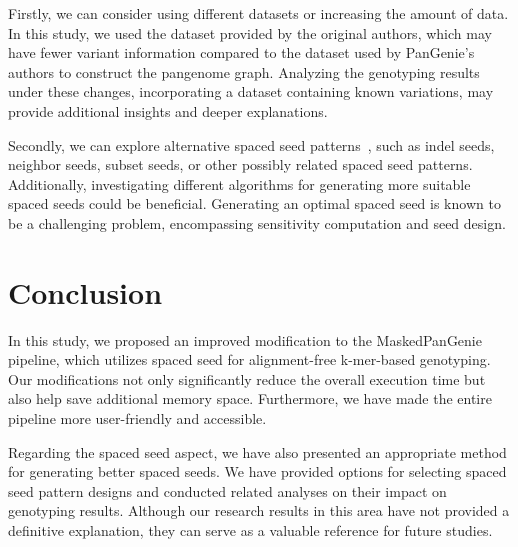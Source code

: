 \documentclass{PHlab-thesis}
\begin{document}
Firstly, we can consider using different datasets or increasing the amount of data. In this study, we used the dataset provided by the original authors, which may have fewer variant information compared to the dataset used by PanGenie's authors to construct the pangenome graph. Analyzing the genotyping results under these changes, incorporating a dataset containing known variations, may provide additional insights and deeper explanations.

Secondly, we can explore alternative spaced seed patterns~\cite{Noe2017SeedSelection}, such as indel seeds, neighbor seeds, subset seeds, or other possibly related spaced seed patterns. Additionally, investigating different algorithms for generating more suitable spaced seeds could be beneficial. Generating an optimal spaced seed is known to be a challenging problem, encompassing sensitivity computation and seed design.

\chapter{Conclusion}
In this study, we proposed an improved modification to the MaskedPanGenie pipeline, which utilizes spaced seed for alignment-free k-mer-based genotyping. Our modifications not only significantly reduce the overall execution time but also help save additional memory space. Furthermore, we have made the entire pipeline more user-friendly and accessible.

Regarding the spaced seed aspect, we have also presented an appropriate method for generating better spaced seeds. We have provided options for selecting spaced seed pattern designs and conducted related analyses on their impact on genotyping results. Although our research results in this area have not provided a definitive explanation, they can serve as a valuable reference for future studies.
\newpage
{}
\printbibliography
\end{document}
